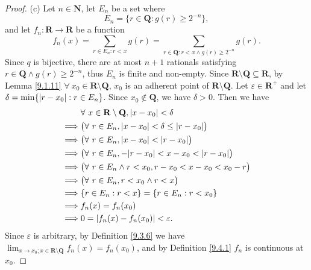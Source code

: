 \begin{proof}{(c)}
    Let \(n \in \mathbf{N}\), let \(E_n\) be a set where
    \[
        E_n = \{r \in \mathbf{Q} : g(r) \geq 2^{-n}\},
    \]
    and let \(f_n : \mathbf{R} \to \mathbf{R}\) be a function
    \[
        f_n(x) = \sum_{r \in E_n : r < x} g(r) = \sum_{r \in \mathbf{Q} : r < x \land g(r) \geq 2^{-n}} g(r).
    \]
    Since \(q\) is bijective, there are at most \(n + 1\) rationals satisfying \(r \in \mathbf{Q} \land g(r) \geq 2^{-n}\), thus \(E_n\) is finite and non-empty.
    Since \(\mathbf{R} \setminus \mathbf{Q} \subseteq \mathbf{R}\), by Lemma \ref{9.1.11} \(\forall\ x_0 \in \mathbf{R} \setminus \mathbf{Q}\), \(x_0\) is an adherent point of \(\mathbf{R} \setminus \mathbf{Q}\).
    Let \(\varepsilon \in \mathbf{R}^+\) and let \(\delta = \min\{\abs*{r - x_0} : r \in E_n\}\).
    Since \(x_0 \notin \mathbf{Q}\), we have \(\delta > 0\).
    Then we have
    \begin{align*}
                 & \forall\ x \in \mathbf{R} \setminus \mathbf{Q}, \abs*{x - x_0} < \delta   \\
        \implies & \big(\forall\ r \in E_n, \abs*{x - x_0} < \delta \leq \abs*{r - x_0}\big) \\
        \implies & \big(\forall\ r \in E_n, \abs*{x - x_0} < \abs*{r - x_0}\big)             \\
        \implies & \big(\forall\ r \in E_n, -\abs*{r - x_0} < x - x_0 < \abs*{r - x_0}\big)  \\
        \implies & \big(\forall\ r \in E_n \land r < x_0, r - x_0 < x - x_0 < x_0 - r\big)   \\
        \implies & \big(\forall\ r \in E_n, r < x_0 \land r < x\big)                         \\
        \implies & \{r \in E_n : r < x\} = \{r \in E_n : r < x_0\}                           \\
        \implies & f_n(x) = f_n(x_0)                                                         \\
        \implies & 0 = \abs*{f_n(x) - f_n(x_0)} < \varepsilon.
    \end{align*}
    Since \(\varepsilon\) is arbitrary, by Definition \ref{9.3.6} we have \(\lim_{x \to x_0 ; x \in \mathbf{R} \setminus \mathbf{Q}} f_n(x) = f_n(x_0)\), and by Definition \ref{9.4.1} \(f_n\) is continuous at \(x_0\).


\end{proof}
